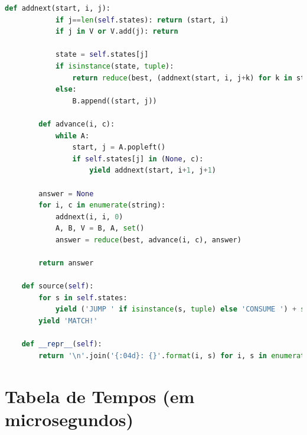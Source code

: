\documentclass[a4paper,12pt,oneside,onecolumn]{uerj}
\begin{document}
\begin{lstlisting}[language=python]
        def addnext(start, i, j):
            if j==len(self.states): return (start, i)
            if j in V or V.add(j): return

            state = self.states[j]
            if isinstance(state, tuple):
                return reduce(best, (addnext(start, i, j+k) for k in state))
            else:
                B.append((start, j))
        
        def advance(i, c):
            while A:
                start, j = A.popleft()
                if self.states[j] in (None, c):
                    yield addnext(start, i+1, j+1)
        
        answer = None
        for i, c in enumerate(string):
            addnext(i, i, 0)
            A, B, V = B, A, set()
            answer = reduce(best, advance(i, c), answer)           

        return answer
       
    def source(self):
        for s in self.states:
            yield ('JUMP ' if isinstance(s, tuple) else 'CONSUME ') + str(s)
        yield 'MATCH!'
       
    def __repr__(self):
        return '\n'.join('{:04d}: {}'.format(i, s) for i, s in enumerate(self.source()))
\end{lstlisting}   


\section{Tabela de Tempos (em microsegundos)}
\end{document}
